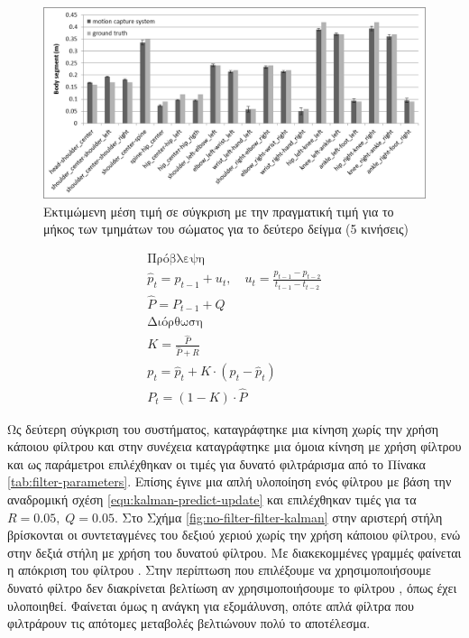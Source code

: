 \begin{figure}[H]
    \centering
    \includegraphics[width=.8\textwidth]{fig/subject02-segments.png}
    \caption{Εκτιμώμενη μέση τιμή σε σύγκριση με την πραγματική τιμή για το μήκος των τμημάτων του σώματος για το δεύτερο δείγμα (5 κινήσεις)}
    \label{fig:subject02-segments}
\end{figure}

\begin{equation}
    \begin{gathered}
        \text{Πρόβλεψη} \\
        \hat{p}_{t} = p_{t-1} + u_{t}, \quad u_{t} = \frac{p_{t-1} - p_{t-2}}{t_{t-1} - t_{t-2}} \\
        \hat{P} = P_{t-1} + Q \\[.5cm]
        \text{Διόρθωση} \\
        Κ = \frac{\hat{P}}{\hat{P} + R}\\
        p_{t} = \hat{p}_{t} + K \cdot (p_{t} - \hat{p}_{t}) \\
        P_{t} = (1 - K) \cdot \hat{P}
    \end{gathered}
    \label{equ:kalman-predict-update}
\end{equation}

Ως δεύτερη σύγκριση του συστήματος, καταγράφτηκε μια κίνηση χωρίς την χρήση κάποιου φίλτρου και στην συνέχεια καταγράφτηκε μια όμοια κίνηση με χρήση φίλτρου και ως παράμετροι επιλέχθηκαν οι τιμές για δυνατό φιλτράρισμα από το Πίνακα \ref{tab:filter-parameters}. Επίσης έγινε μια απλή υλοποίηση ενός φίλτρου  με βάση την αναδρομική σχέση \ref{equ:kalman-predict-update} και επιλέχθηκαν τιμές για τα $R = 0.05,\; Q = 0.05$. Στο Σχήμα \ref{fig:no-filter-filter-kalman} στην αριστερή στήλη βρίσκονται οι συντεταγμένες του δεξιού χεριού χωρίς την χρήση κάποιου φίλτρου, ενώ στην δεξιά στήλη με χρήση του δυνατού φίλτρου. Με διακεκομμένες γραμμές φαίνεται η απόκριση του φίλτρου . Στην περίπτωση που επιλέξουμε να χρησιμοποιήσουμε δυνατό φίλτρο δεν διακρίνεται βελτίωση αν χρησιμοποιήσουμε το φίλτρου , όπως έχει υλοποιηθεί. Φαίνεται όμως η ανάγκη για εξομάλυνση, οπότε απλά φίλτρα που φιλτράρουν τις απότομες μεταβολές βελτιώνουν πολύ το αποτέλεσμα.

